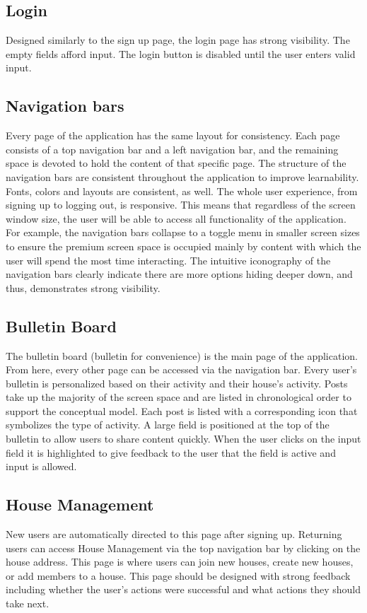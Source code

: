 \documentclass[12pt]{article}
\begin{document}
\subsection{Login}
Designed similarly to the sign up page, the login page has strong visibility. The empty fields afford input. The login button is disabled until the user enters valid input. 

\subsection{Navigation bars}
Every page of the application has the same layout for consistency. Each page consists of a top navigation bar and a left navigation bar, and the remaining space is devoted to hold the content of that specific page. The structure of the navigation bars are consistent throughout the application to improve learnability. Fonts, colors and layouts are consistent, as well. The whole user experience, from signing up to logging out, is responsive. This means that regardless of the screen window size, the user will be able to access all functionality of the application. For example, the navigation bars collapse to a toggle menu in smaller screen sizes to ensure the premium screen space is occupied mainly by content with which the user will spend the most time interacting. The intuitive iconography of the navigation bars clearly indicate there are more options hiding deeper down, and thus, demonstrates strong visibility. 

\subsection{Bulletin Board}
The bulletin board (bulletin for convenience) is the main page of the application. From here, every other page can be accessed via the navigation bar. Every user's bulletin is personalized based on their activity and their house's activity. Posts take up the majority of the screen space and are listed in chronological order to support the conceptual model. Each post is listed with a corresponding icon that symbolizes the type of activity. A large field is positioned at the top of the bulletin to allow users to share content quickly. When the user clicks on the input field it is highlighted to give feedback to the user that the field is active and input is allowed.  

\subsection{House Management}\label{management}
New users are automatically directed to this page after signing up. Returning users can access House Management via the top navigation bar by clicking on the house address. This page is where users can join new houses, create new houses, or add members to a house. This page should be designed with strong feedback including whether the user's actions were successful and what actions they should take next. 
\end{document}
